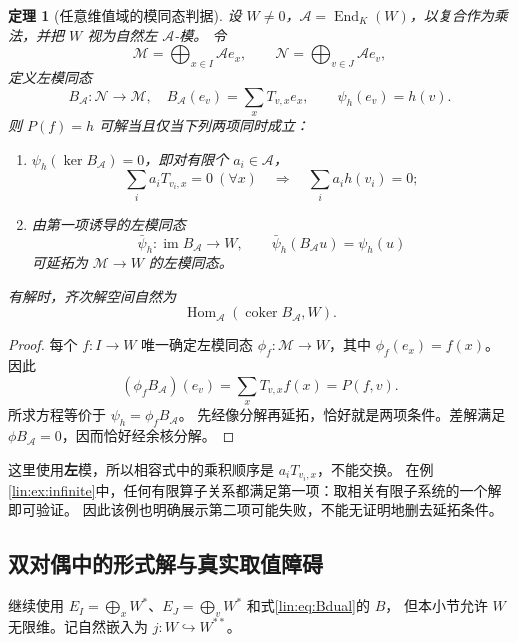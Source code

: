 \documentclass[11pt,a4paper,oneside,openany]{book}
\theoremstyle{lecture}
\newtheorem{theorem}{定理}[section]
\newcommand{\Hom}{\operatorname{Hom}}
\newcommand{\End}{\operatorname{End}}
\newcommand{\im}{\operatorname{im}}
\newcommand{\coker}{\operatorname{coker}}
\newcommand{\calA}{\mathcal A}
\newcommand{\calM}{\mathcal M}
\newcommand{\calN}{\mathcal N}
\numberwithin{equation}{section}
\begin{document}
\begin{theorem}[任意维值域的模同态判据]\label{lin:thm:module}
设 $W\ne0$，$\calA=\End_K(W)$，以复合作为乘法，并把 $W$ 视为自然左 $\calA$-模。
令
\[
 \calM=\bigoplus_{x\in I}\calA e_x,\qquad
 \calN=\bigoplus_{v\in J}\calA e_v,
\]
定义左模同态
\[
 B_{\calA}:\calN\to\calM,\quad B_{\calA}(e_v)=\sum_x T_{v,x}e_x,
 \qquad\psi_h(e_v)=h(v).
\]
则 $P(f)=h$ 可解当且仅当下列两项同时成立：
\begin{enumerate}
\item $\psi_h(\ker B_{\calA})=0$，即对有限个 $a_i\in\calA$，
\[
 \sum_i a_iT_{v_i,x}=0\ (\forall x)\quad\Longrightarrow\quad
 \sum_i a_i h(v_i)=0;
\]
\item 由第一项诱导的左模同态
\[
 \bar\psi_h:\im B_{\calA}\to W,\qquad
 \bar\psi_h(B_{\calA}u)=\psi_h(u)
\]
可延拓为 $\calM\to W$ 的左模同态。
\end{enumerate}
有解时，齐次解空间自然为
\[
 \Hom_{\calA}(\coker B_{\calA},W).
\]
\end{theorem}
\begin{proof}
每个 $f:I\to W$ 唯一确定左模同态
$\phi_f:\calM\to W$，其中 $\phi_f(e_x)=f(x)$。
因此
\[
 (\phi_f B_{\calA})(e_v)=\sum_xT_{v,x}f(x)=P(f,v).
\]
所求方程等价于 $\psi_h=\phi_fB_{\calA}$。
先经像分解再延拓，恰好就是两项条件。差解满足 $\phi B_{\calA}=0$，因而恰好经余核分解。
\end{proof}
这里使用\textbf{左}模，所以相容式中的乘积顺序是 $a_iT_{v_i,x}$，不能交换。
在例\ref{lin:ex:infinite}中，任何有限算子关系都满足第一项：取相关有限子系统的一个解即可验证。
因此该例也明确展示第二项可能失败，不能无证明地删去延拓条件。

\subsection{双对偶中的形式解与真实取值障碍}
继续使用 $E_I=\bigoplus_xW^*$、$E_J=\bigoplus_vW^*$ 和式\eqref{lin:eq:Bdual}的 $B$，
但本小节允许 $W$ 无限维。记自然嵌入为 $j:W\hookrightarrow W^{**}$。
\end{document}
